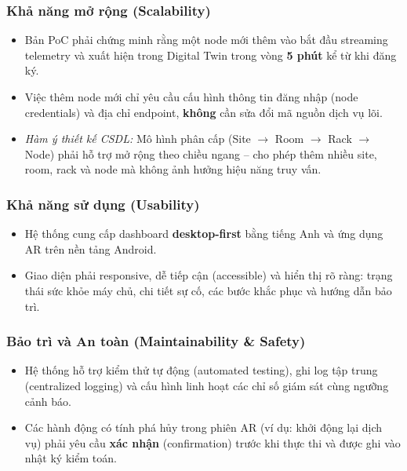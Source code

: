 \subsubsection{Khả năng mở rộng (Scalability)}
\begin{itemize}[leftmargin=2em]
    \item Bản PoC phải chứng minh rằng một node mới thêm vào bắt đầu streaming telemetry và xuất hiện trong Digital Twin trong vòng \textbf{5 phút} kể từ khi đăng ký.
    \item Việc thêm node mới chỉ yêu cầu cấu hình thông tin đăng nhập (node credentials) và địa chỉ endpoint, \textbf{không} cần sửa đổi mã nguồn dịch vụ lõi.
    \item \textit{Hàm ý thiết kế CSDL:} Mô hình phân cấp (Site $\rightarrow$ Room $\rightarrow$ Rack $\rightarrow$ Node) phải hỗ trợ mở rộng theo chiều ngang -- cho phép thêm nhiều site, room, rack và node mà không ảnh hưởng hiệu năng truy vấn.
\end{itemize}

\subsubsection{Khả năng sử dụng (Usability)}
\begin{itemize}[leftmargin=2em]
    \item Hệ thống cung cấp dashboard \textbf{desktop-first} bằng tiếng Anh và ứng dụng AR trên nền tảng Android.
    \item Giao diện phải responsive, dễ tiếp cận (accessible) và hiển thị rõ ràng: trạng thái sức khỏe máy chủ, chi tiết sự cố, các bước khắc phục và hướng dẫn bảo trì.
\end{itemize}

\subsubsection{Bảo trì và An toàn (Maintainability \& Safety)}
\begin{itemize}[leftmargin=2em]
    \item Hệ thống hỗ trợ kiểm thử tự động (automated testing), ghi log tập trung (centralized logging) và cấu hình linh hoạt các chỉ số giám sát cùng ngưỡng cảnh báo.
    \item Các hành động có tính phá hủy trong phiên AR (ví dụ: khởi động lại dịch vụ) phải yêu cầu \textbf{xác nhận} (confirmation) trước khi thực thi và được ghi vào nhật ký kiểm toán.
\end{itemize}

